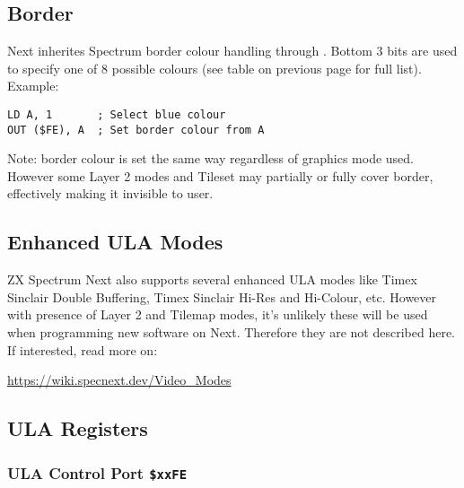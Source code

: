 \documentclass[12pt,twoside,openright,a4paper]{book}
\begin{document}
\subsection{Border}

Next inherites Spectrum border colour handling through . Bottom 3 bits are used to specify one of 8 possible colours (see table on previous page for full list). Example:

\begin{Verbatim}
LD A, 1       ; Select blue colour
OUT ($FE), A  ; Set border colour from A
\end{Verbatim}

Note: border colour is set the same way regardless of graphics mode used. However some Layer 2 modes and Tileset may partially or fully cover border, effectively making it invisible to user.

\subsection{Enhanced ULA Modes}

ZX Spectrum Next also supports several enhanced ULA modes like Timex Sinclair Double Buffering, Timex Sinclair Hi-Res and Hi-Colour, etc. However with presence of Layer 2 and Tilemap modes, it's unlikely these will be used when programming new software on Next. Therefore they are not described here. If interested, read more on:

\url{https://wiki.specnext.dev/Video_Modes}


\subsection{ULA Registers}

\subsubsection{ULA Control Port {\tt \$xxFE}}

\begin{NextPort}
\end{NextPort}
\end{document}
